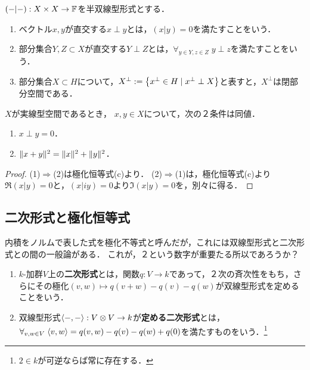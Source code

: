 \documentclass[uplatex,dvipdfmx]{jsreport}
\begin{document}
\begin{definition}[orthogonal]
    $(-|-):X\times X\to\mathbb{F}$を半双線型形式とする．
    \begin{enumerate}
        \item ベクトル$x,y$が直交する$x\perp y$とは，$(x|y)=0$を満たすことをいう．
        \item 部分集合$Y,Z\subset X$が直交する$Y\perp Z$とは，$\forall_{y\in Y,z\in Z}\;y\perp z$を満たすことをいう．
        \item 部分集合$X\subset H$について，$X^\perp:=\left\{x^\perp\in H\mid x^\perp\perp X\right\}$と表すと，$X^\perp$は閉部分空間である．
    \end{enumerate}
\end{definition}

\begin{lemma}\label{lemma-Pythagoras-identity}
    $X$が実線型空間であるとき，
    $x,y\in X$について，次の２条件は同値．
    \begin{enumerate}
        \item $x\perp y=0$．
        \item $\|x+y\|^2=\|x\|^2+\|y\|^2$．
    \end{enumerate}
\end{lemma}
\begin{proof}
    (1)$\Rightarrow$(2)は極化恒等式(c)より．
    (2)$\Rightarrow$(1)は，極化恒等式(c)より$\Re(x|y)=0$と，$(x|iy)=0$より$\Im(x|y)=0$を，別々に得る．
\end{proof}

\subsection{二次形式と極化恒等式}

\begin{tcolorbox}[colframe=ForestGreen, colback=ForestGreen!10!white,breakable,colbacktitle=ForestGreen!40!white,coltitle=black,fonttitle=\bfseries\sffamily,
title=]
    内積をノルムで表した式を極化不等式と呼んだが，これには双線型形式と二次形式との間の一般論がある．
    これが，２という数字が重要たる所以であろうか？
\end{tcolorbox}

\begin{definition}\mbox{}
    \begin{enumerate}
        \item $k$-加群$V$上の\textbf{二次形式}とは，関数$q:V\to k$であって，２次の斉次性をもち，さらにその極化$(v,w)\mapsto q(v+w)-q(v)-q(w)$が双線型形式を定めることをいう．
        \item 双線型形式$\langle-,-\rangle:V\otimes V\to k$が\textbf{定める二次形式}とは，$\forall_{v,w\in V}\;\langle v,w\rangle=q(v,w)-q(v)-q(w)+q(0)$を満たすものをいう．\footnote{$2\in k$が可逆ならば常に存在する．}
    \end{enumerate}
\end{definition}
\end{document}
